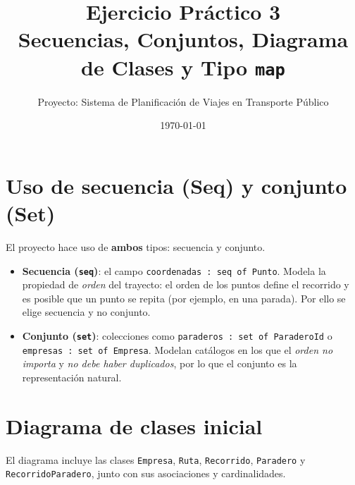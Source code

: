 \documentclass[11pt,a4paper]{article}
\title{\textbf{Ejercicio Práctico 3}\\[2mm]
\large Secuencias, Conjuntos, Diagrama de Clases y Tipo \texttt{map}}
\author{Proyecto: Sistema de Planificación de Viajes en Transporte Público}
\date{\today}
\begin{document}
\maketitle

\section{Uso de secuencia (Seq) y conjunto (Set)}

El proyecto hace uso de \textbf{ambos} tipos: secuencia y conjunto.

\begin{itemize}
  \item \textbf{Secuencia (\texttt{seq})}: el campo \texttt{coordenadas : seq of Punto}. Modela la propiedad de \emph{orden} del trayecto: el orden de los puntos define el recorrido y es posible que un punto se repita (por ejemplo, en una parada). Por ello se elige secuencia y no conjunto.
  \item \textbf{Conjunto (\texttt{set})}: colecciones como \texttt{paraderos : set of ParaderoId} o \texttt{empresas : set of Empresa}. Modelan catálogos en los que el \emph{orden no importa} y \emph{no debe haber duplicados}, por lo que el conjunto es la representación natural.
\end{itemize}

\section{Diagrama de clases inicial}

El diagrama incluye las clases \texttt{Empresa}, \texttt{Ruta}, \texttt{Recorrido}, \texttt{Paradero} y \texttt{RecorridoParadero}, junto con sus asociaciones y cardinalidades.
\end{document}
